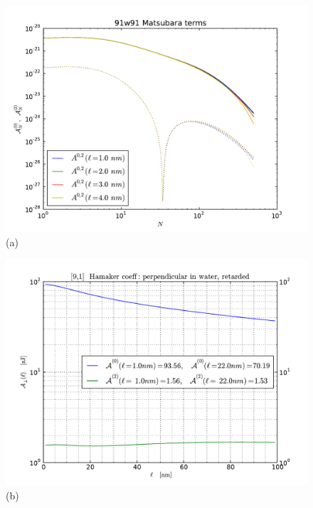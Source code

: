 \documentclass[onecolumn,letterpaper,amsmath,amssymb,floatfix,aps,superscriptaddress]{revtex4}
\begin{document}
\begin{figure}[t!]
\begin{center}
\begin{minipage}[b]{0.40\textwidth}
\begin{center}
\includegraphics[width=1.2\textwidth]{plots/91_A_vs_n.pdf} (a)
\end{center}
\end{minipage}
\hskip 43pt
\begin{minipage}[b]{0.40\textwidth}
\begin{center}
\includegraphics[width=1.2\textwidth]{plots/140322_91w91_HCs_perpendicular_ret.pdf} (b)
\end{center}

\end{minipage}
\end{center}
\end{figure}
\end{document}
